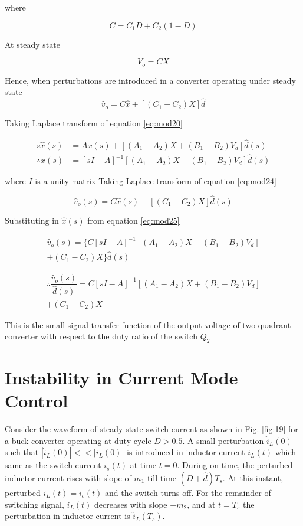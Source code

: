 \documentclass[a4paper]{IEEEtran}
\begin{document}
	where
	
	\begin{equation}
		C = C_1D+C_2(1-D)
		\label{eq:mod22}
	\end{equation}
	
	At steady state

	\begin{equation}
		V_o = CX
		\label{eq:mod23}
	\end{equation}
	
	Hence, when perturbations are introduced in a converter operating under steady state
		\begin{equation}
		\hat{v}_o = C\hat{x}+[(C_1-C_2)X]\hat{d}
		\label{eq:mod24}
	\end{equation}
	
	Taking Laplace transform of equation \eqref{eq:mod20}
	
	\begin{align}
		s\hat{x}(s) &= Ax(s)+[(A_1-A_2)X+(B_1-B_2)V_d]\hat{d}(s)\\
		\therefore \hat{x}(s) &= [sI-A]^{-1}[(A_1-A_2)X+(B_1-B_2)V_d]\hat{d}(s)
		\label{eq:mod25}
	\end{align}
	
	where $I$ is a unity matrix
	Taking Laplace transform of equation \eqref{eq:mod24}
	
	\begin{equation}
		\hat{v}_o(s) = C\hat{x}(s)+[(C_1-C_2)X]\hat{d}(s)
		\label{eq:mod26}
	\end{equation}
	
	Substituting in $\hat{x}(s)$ from equation \eqref{eq:mod25}
	
	\begin{multline}
		\hat{v}_o(s) = \{C[sI-A]^{-1}[(A_1-A_2)X+(B_1-B_2)V_d]\\+(C_1-C_2)X\}\hat{d}(s)
		\label{eq:mod27b}
	\end{multline}

	\begin{multline}
		\therefore \dfrac{\hat{v}_o(s)}{\hat{d}(s)} = C[sI-A]^{-1}[(A_1-A_2)X+(B_1-B_2)V_d]\\+(C_1-C_2)X
		\label{eq:mod27}
	\end{multline}

	This is the small signal transfer function of the output voltage of two quadrant converter with respect to the duty ratio of the switch $Q_2$

\section{Instability in Current Mode Control}
\label{app:instability-cmc}
	Consider the waveform of steady state switch current as shown in Fig. \ref{fig:19} for a buck converter operating at duty cycle $D>0.5$. A small perturbation $\hat{i}_L(0)$ such that $|\hat{i}_L(0)| << |i_L(0)|$ is introduced in inductor current $i_L(t)$ which same as the switch current $i_s(t)$ at time $t=0$. During on time, the perturbed inductor current rises with slope of $m_1$ till time $(D+\hat{d})T_s$. At this instant, perturbed $i_L(t)=i_c(t)$ and the switch turns off. For the remainder of switching signal, $i_L(t)$ decreases with slope $-m_2$, and at $t=T_s$ the perturbation in inductor current is $\hat{i}_L(T_s)$. 
\end{document}
